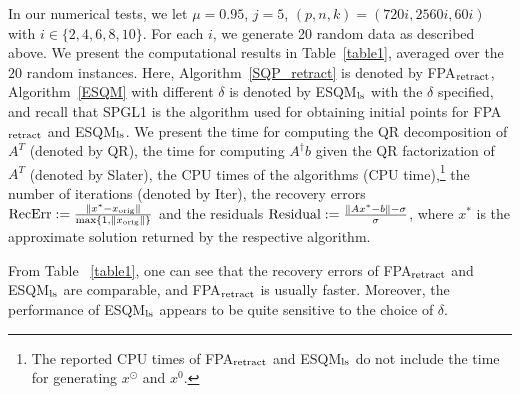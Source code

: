\documentclass[10pt]{article}
\numberwithin{equation}{section}
\def\R{{\rm I\!R}}
\def\xfeas{x^\odot}
\def\xorig{{x_{\rm orig}}}
\begin{document}

In our numerical tests, we let $\mu =0.95$, $j = 5$, $(p,n,k) = (720i,2560i,60i)$ with $i\in \{2, 4, 6, 8, 10\}$. For each $i$, we generate 20 random data as described above. We present the computational results in Table~\ref{table1}, averaged over the $20$ random instances. Here, Algorithm~\ref{SQP_retract} is denoted by FPA$_{\rm retract}$, Algorithm~\ref{ESQM} with different $\delta$ is denoted by ESQM$_{\rm ls}$ with the $\delta$ specified, and recall that SPGL1 is the algorithm used for obtaining initial points for FPA$_{\rm retract}$ and ESQM$_{\rm ls}$. We present the time for computing the QR decomposition of $A^T$ (denoted by QR), the time for computing $A^\dagger b$ given the QR factorization of $A^T$ (denoted by Slater), the CPU times of the algorithms (CPU time),\footnote{The reported CPU times of FPA$_{\rm retract}$ and ESQM$_{\rm ls}$ do not include the time for generating $\xfeas$ and $x^0$.} the number of iterations (denoted by Iter), the recovery errors $\text{RecErr} := \frac{\|x^* - \xorig\|}{\max\{1, \|\xorig\|\}}$ and the residuals ${\rm Residual} := \frac{\|Ax^* - b\| - \sigma }{\sigma}$, where $x^*$ is the approximate solution returned by the respective algorithm.

From Table ~\ref{table1}, one can see that the recovery errors of FPA$_{\rm retract}$ and ESQM$_{\rm ls}$ are comparable, and FPA$_{\rm retract}$ is usually faster. Moreover, the performance of ESQM$_{\rm ls}$ appears to be quite sensitive to the choice of $\delta$.

\end{document}
